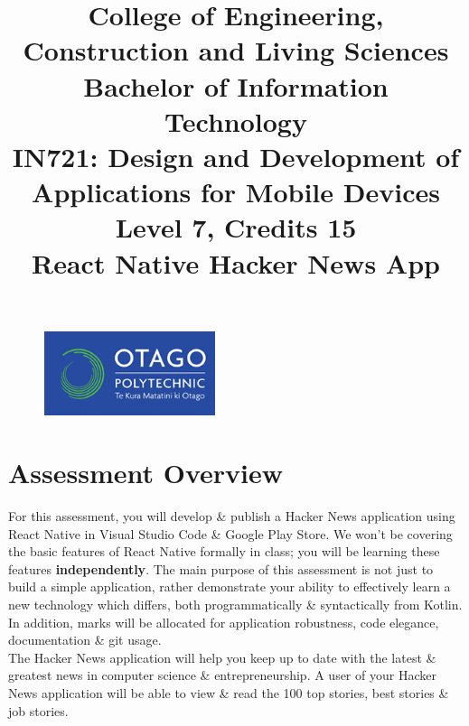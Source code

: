 \documentclass{article}
\author{}
\begin{document}
\begin{figure}
    \centering
    \includegraphics[width=50mm]{./img/logo.png}
\end{figure}

\title{College of Engineering, Construction and Living Sciences\\Bachelor of Information Technology\\IN721: Design and Development of Applications for Mobile Devices\\Level 7, Credits 15\\\textbf{React Native Hacker News App}}
\date{}
\maketitle

\section*{Assessment Overview}
For this assessment, you will develop \& publish a Hacker News application using React Native in Visual Studio Code \& Google Play Store. We won't be covering the basic features of React Native formally in class; you will be learning these features \textbf{independently}. The main purpose of this assessment is not just to build a simple application, rather demonstrate your ability to effectively learn a new technology which differs, both programmatically \& syntactically from Kotlin. In addition, marks will be allocated for application robustness, code elegance, documentation \& git usage. \\

The Hacker News application will help you keep up to date with the latest \& greatest news in computer science \& entrepreneurship. A user of your Hacker News application will be able to view \& read the 100 top stories, best stories \& job stories.
\end{document}
